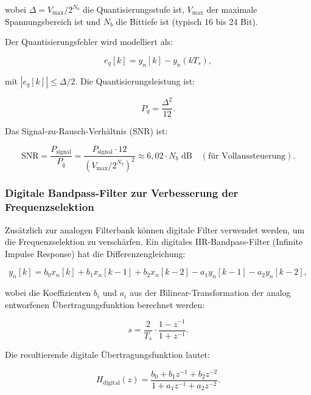 ﻿\documentclass[12pt, a4paper]{article}
\theoremstyle{definition}
\theoremstyle{remark}
\begin{document}
wobei $\Delta = V_{\max} / 2^{N_b}$ die Quantisierungsstufe ist, $V_{\max}$ 
der maximale Spannungsbereich ist und $N_b$ die Bittiefe ist (typisch 16 bis 24 Bit).

Der Quantisierungsfehler wird modelliert als:

\begin{equation}
\label{eq:quantization_error}
e_q[k] = y_n[k] - y_n(k T_s),
\end{equation}

mit $|e_q[k]| \leq \Delta/2$. Die Quantisierungsleistung ist:

\begin{equation}
\label{eq:quantization_power}
P_q = \frac{\Delta^2}{12}.
\end{equation}

Das Signal-zu-Rausch-Verhältnis (SNR) ist:

\begin{equation}
\label{eq:snr_quantization}
\mathrm{SNR} = \frac{P_{\mathrm{signal}}}{P_q} 
= \frac{P_{\mathrm{signal}} \cdot 12}{(V_{\max}/2^{N_b})^2} 
\approx 6{,}02 \cdot N_b \text{ dB} \quad (\text{für Vollaussteuerung}).
\end{equation}

\subsubsection{Digitale Bandpass-Filter zur Verbesserung der Frequenzselektion}

Zusätzlich zur analogen Filterbank können digitale Filter verwendet werden, um 
die Frequenzselektion zu verschärfen. Ein digitales IIR-Bandpass-Filter 
(Infinite Impulse Response) hat die Differenzengleichung:

\begin{equation}
\label{eq:digital_iir}
y_n[k] = b_0 x_n[k] + b_1 x_n[k-1] + b_2 x_n[k-2] 
- a_1 y_n[k-1] - a_2 y_n[k-2],
\end{equation}

wobei die Koeffizienten $b_i$ und $a_i$ aus der Bilinear-Transformation der 
analog entworfenen Übertragungsfunktion berechnet werden:

\begin{equation}
\label{eq:bilinear_transform}
s = \frac{2}{T_s} \cdot \frac{1 - z^{-1}}{1 + z^{-1}}.
\end{equation}

Die resultierende digitale Übertragungsfunktion lautet:

\begin{equation}
\label{eq:digital_transfer_function}
H_{\mathrm{digital}}(z) = \frac{b_0 + b_1 z^{-1} + b_2 z^{-2}}{1 + a_1 z^{-1} + a_2 z^{-2}}.
\end{equation}
\end{document}
